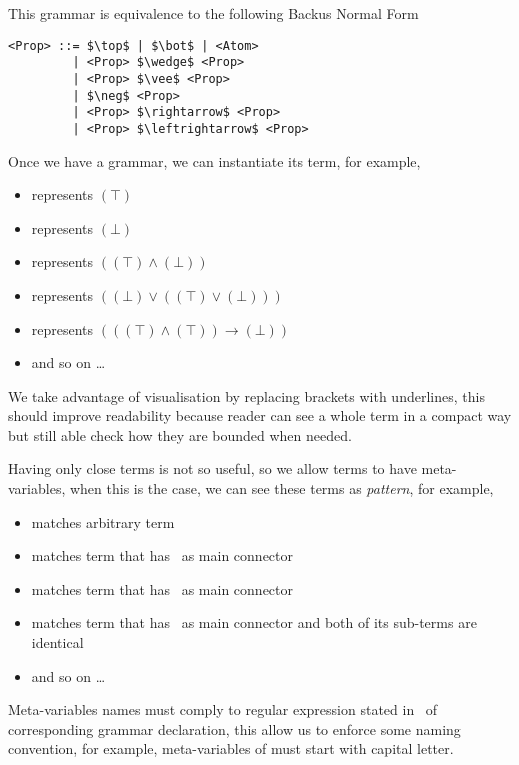 \documentclass[master.tex]{subfiles}
\begin{document}
This grammar is equivalence to the following Backus Normal Form
\begin{lstlisting}[mathescape,basicstyle=\footnotesize\ttfamily,breaklines=true]
<Prop> ::= $\top$ | $\bot$ | <Atom>
         | <Prop> $\wedge$ <Prop>
         | <Prop> $\vee$ <Prop>
         | $\neg$ <Prop>
         | <Prop> $\rightarrow$ <Prop>
         | <Prop> $\leftrightarrow$ <Prop>
\end{lstlisting}

\newcommand{\propTop}[0]{\bat{\pifmt{$\top$}}}
\newcommand{\propBot}[0]{\bat{\pifmt{$\bot$}}}
\newcommand{\propAnd}[0]{\pifmt{$\wedge$}}
\newcommand{\propOr}[0]{\pifmt{$\vee$}}
\newcommand{\propNot}[0]{\pifmt{$\neg$}}
\newcommand{\propImp}[0]{\pifmt{$\rightarrow$}}
\newcommand{\propIff}[0]{\pifmt{$\leftrightarrow$}}

Once we have a grammar, we can instantiate its term, for example,
\begin{itemize}
  \item \propTop represents $(\top)$
  \item \propBot represents $(\bot)$
  \item \bat{\propTop\propAnd\propBot} represents $((\top) \wedge (\bot))$
  \item \bat{\propBot\propOr\bat{\propTop\propOr\propBot}}
    represents $((\bot) \vee ((\top) \vee (\bot)))$
  \item \bat{\bat{\propTop\propAnd\propTop}\propImp\propBot}
    represents $(((\top) \wedge (\top)) \rightarrow (\bot))$
  \item and so on \dots
\end{itemize}
We take advantage of visualisation by replacing brackets with underlines, this
should improve readability because reader can see a whole term in a compact
way but still able check how they are bounded when needed.

Having only close terms is not so useful, so we allow terms to have
meta-variables, when this is the case, we can see these terms as \emph{pattern},
for example,
\begin{itemize}
  \item {} matches arbitrary  term
  \item \bat{\propNot\pvar{A}} matches  term that has
    \propNot\ as main connector
  \item \bat{\pvar{A}\propAnd\pvar{B}} matches  term that has
    \propAnd\ as main connector
  \item \bat{\pvar{A}\propAnd\pvar{A}} matches  term that has
    \propAnd\ as main connector and both of its sub-terms are identical
  \item and so on \dots
\end{itemize}
Meta-variables names must comply to regular expression stated in \kVarRegex\ of
corresponding grammar declaration, this allow us to enforce some naming
convention, for example, meta-variables of  must start with capital
letter.
\end{document}
